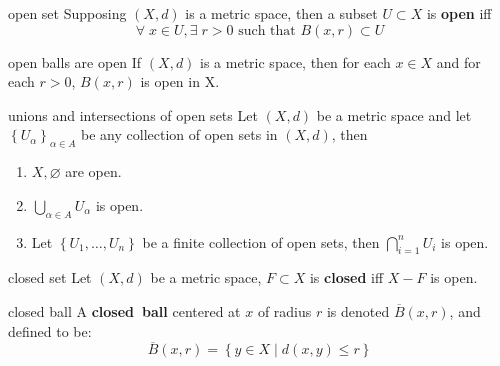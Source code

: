 \documentclass[avery5371,grid]{flashcards}
\newcommand{\st}{\textrm{ such that }}
\newcommand{\setst}{\; | \;}
\begin{document}
\begin{flashcard}[Definition]{open set}
Supposing $(X,d)$ is a metric space, then a subset $U \subset X$
is \textbf{open} iff
\begin{equation*}
\forall \; x \in U, \exists \; r>0 \st B(x,r) \subset U
\end{equation*}
\end{flashcard}

\begin{flashcard}[Proposition]{open balls are open}
If $(X,d)$ is a metric space, then for each $x \in X$ and for each
$r>0$, $B(x,r)$ is open in X.
\end{flashcard}

\begin{flashcard}[Theorem]{unions and intersections of open sets}
Let $(X,d)$ be a metric space and let $\left\{U_{\alpha}\right\}_{\alpha \in A}$ be any
collection of open sets in $(X,d)$, then
\begin{enumerate}
 \item $X,\varnothing$ are open.
 \item $\bigcup_{\alpha \in A} U_{\alpha}$ is open.
 \item Let $\left\{U_1, \ldots , U_n\right\}$ be a finite
 collection of open sets, then $\bigcap^{n}_{i=1}U_i$ is open.
\end{enumerate}
\end{flashcard}

\begin{flashcard}[Definition]{closed set}
Let $(X,d)$ be a metric space, $F \subset X$ is \mbox{\textbf{closed}} iff
$X - F$ is open.
\end{flashcard}

\begin{flashcard}[Definition]{closed ball}
A \mbox{\textbf{closed ball}} centered at $x$ of radius $r$ is denoted
$\overline{B}(x,r)$, and defined to be:
\begin{equation*}
\overline{B}(x,r) = \left\{ y \in X \setst d(x,y) \leq r \right\}
\end{equation*}
\end{flashcard}
\end{document}
